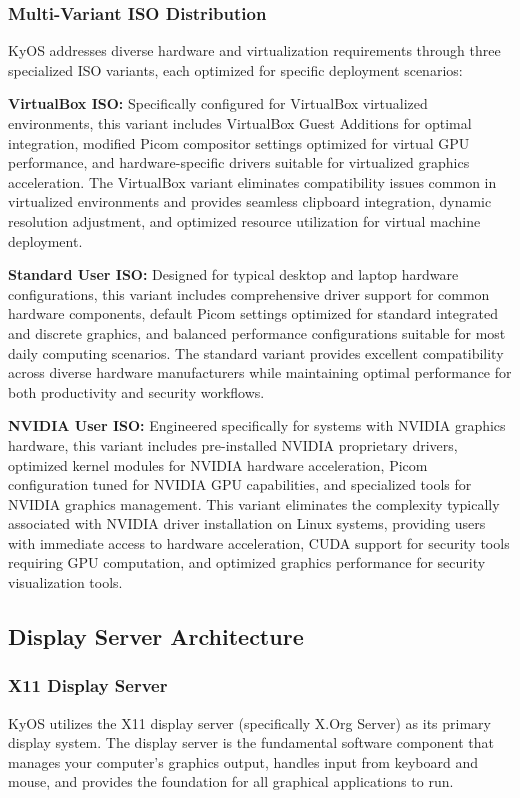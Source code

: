 \documentclass[12pt,a4paper]{article}
\begin{document}
\subsubsection{Multi-Variant ISO Distribution}
KyOS addresses diverse hardware and virtualization requirements through three specialized ISO variants, each optimized for specific deployment scenarios:

\textbf{VirtualBox ISO:} Specifically configured for VirtualBox virtualized environments, this variant includes VirtualBox Guest Additions for optimal integration, modified Picom compositor settings optimized for virtual GPU performance, and hardware-specific drivers suitable for virtualized graphics acceleration. The VirtualBox variant eliminates compatibility issues common in virtualized environments and provides seamless clipboard integration, dynamic resolution adjustment, and optimized resource utilization for virtual machine deployment.

\textbf{Standard User ISO:} Designed for typical desktop and laptop hardware configurations, this variant includes comprehensive driver support for common hardware components, default Picom settings optimized for standard integrated and discrete graphics, and balanced performance configurations suitable for most daily computing scenarios. The standard variant provides excellent compatibility across diverse hardware manufacturers while maintaining optimal performance for both productivity and security workflows.

\textbf{NVIDIA User ISO:} Engineered specifically for systems with NVIDIA graphics hardware, this variant includes pre-installed NVIDIA proprietary drivers, optimized kernel modules for NVIDIA hardware acceleration, Picom configuration tuned for NVIDIA GPU capabilities, and specialized tools for NVIDIA graphics management. This variant eliminates the complexity typically associated with NVIDIA driver installation on Linux systems, providing users with immediate access to hardware acceleration, CUDA support for security tools requiring GPU computation, and optimized graphics performance for security visualization tools.

\subsection{Display Server Architecture}

\subsubsection{X11 Display Server}
KyOS utilizes the X11 display server (specifically X.Org Server) as its primary display system. The display server is the fundamental software component that manages your computer's graphics output, handles input from keyboard and mouse, and provides the foundation for all graphical applications to run.
\end{document}
